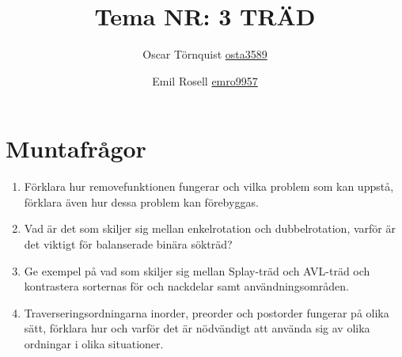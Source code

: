 \documentclass[a5paper,10pt,oneside]{article}
\title{Tema NR: 3 TRÄD}
\author{Oscar Törnquist \url{osta3589} \and Emil Rosell \url{emro9957}}
\begin{document}
\maketitle


\section*{Muntafrågor}
\begin{enumerate}
\item Förklara hur removefunktionen fungerar och vilka problem som kan uppstå, förklara även hur dessa problem kan förebyggas.
\item Vad är det som skiljer sig mellan enkelrotation och dubbelrotation, varför är det viktigt för balanserade binära sökträd?
\item Ge exempel på vad som skiljer sig mellan Splay-träd och AVL-träd och kontrastera sorternas för och nackdelar samt användningsområden.
\item Traverseringsordningarna inorder, preorder och postorder fungerar på olika sätt, förklara hur och varför det är nödvändigt att använda sig av olika ordningar i olika situationer.
\end{enumerate}
\end{document}
